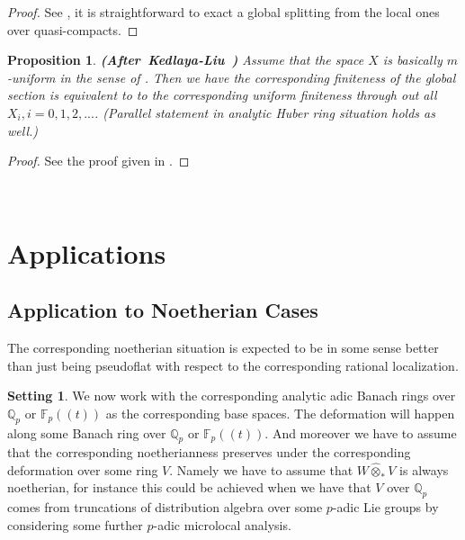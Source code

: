 \documentclass[12pt]{amsart}
\newtheorem{proposition}[theorem]{Proposition}
\theoremstyle{definition}
\numberwithin{equation}{section}
\newtheorem{setting}[theorem]{Setting}
\begin{document}
\begin{proof}
See \cite[Corollary 2.6.8]{KL2}, it is straightforward to exact a global splitting from the local ones over quasi-compacts.	
\end{proof}




\begin{proposition}\mbox{\bf{(After Kedlaya-Liu \cite[Proposition 2.6.17]{KL2})}} 
Assume that the space $X$ is basically $m$-uniform in the sense of \cite{KL2}. Then we have the corresponding finiteness of the global section is equivalent to to the corresponding uniform finiteness through out all $X_i,i=0,1,2,...$. (Parallel statement in analytic Huber ring situation holds as well.)  	
\end{proposition}



\begin{proof}
See the proof given in \cite[Theorem 6.27]{TX2}. 	
\end{proof}



\









\section{Applications} \label{section6}


\subsection{Application to Noetherian Cases} 


\indent The corresponding noetherian situation is expected to be in some sense better than just being pseudoflat with respect to the corresponding rational localization.

\begin{setting}
We now work with the corresponding analytic adic Banach rings over $\mathbb{Q}_p$ or $\mathbb{F}_p((t))$ as the corresponding base spaces. The deformation will happen along some Banach ring over $\mathbb{Q}_p$ or $\mathbb{F}_p((t))$. And moreover we have to assume that the corresponding noetherianness preserves under the corresponding deformation over some ring $V$. Namely we have to assume that $W\widehat{\otimes}_* V$ is always noetherian, for instance this could be achieved when we have that $V$ over $\mathbb{Q}_p$ comes from truncations of distribution algebra over some $p$-adic Lie groups by considering some further $p$-adic microlocal analysis.
\end{setting}
\end{document}
